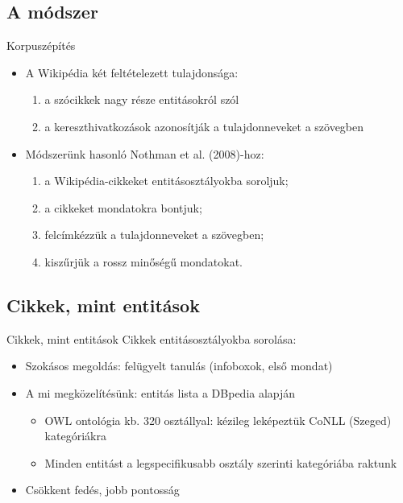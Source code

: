\documentclass[utf8x,t]{beamer}
\newcommand{\vitem}{\item \vspace{4pt}}
\begin{document}
\subsection*{A módszer}

\begin{frame}{Korpuszépítés}
  \begin{itemize}
  \vitem A Wikipédia két feltételezett tulajdonsága:
    \begin{enumerate}
    \vitem a szócikkek nagy része entitásokról szól
    \vitem a kereszthivatkozások azonosítják a tulajdonneveket a szövegben
    \end{enumerate}
  \vitem Módszerünk hasonló Nothman et al. (2008)-hoz:
    \begin{enumerate}
    \vitem a Wikipédia-cikkeket entitásosztályokba soroljuk;
    \vitem a cikkeket mondatokra bontjuk;
    \vitem felcímkézzük a tulajdonneveket a szövegben;
    \vitem kiszűrjük a rossz minőségű mondatokat.
    \end{enumerate}
  \end{itemize}
\end{frame}

\subsection{Cikkek, mint entitások}
\begin{frame}{Cikkek, mint entitások}
  \bigskip
  Cikkek entitásosztályokba sorolása: %
  \smallskip
  \begin{itemize}
  \vitem Szokásos megoldás: felügyelt tanulás (infoboxok, első mondat)
  \vitem A mi megközelítésünk: entitás lista a DBpedia alapján
    \begin{itemize}
    \vitem OWL ontológia kb. 320 osztállyal: kézileg leképeztük CoNLL (Szeged) kategóriákra
    \vitem Minden entitást a legspecifikusabb osztály szerinti kategóriába raktunk
    \end{itemize}
  \item Csökkent fedés, jobb pontosság
  \end{itemize}
\end{frame}
\end{document}
